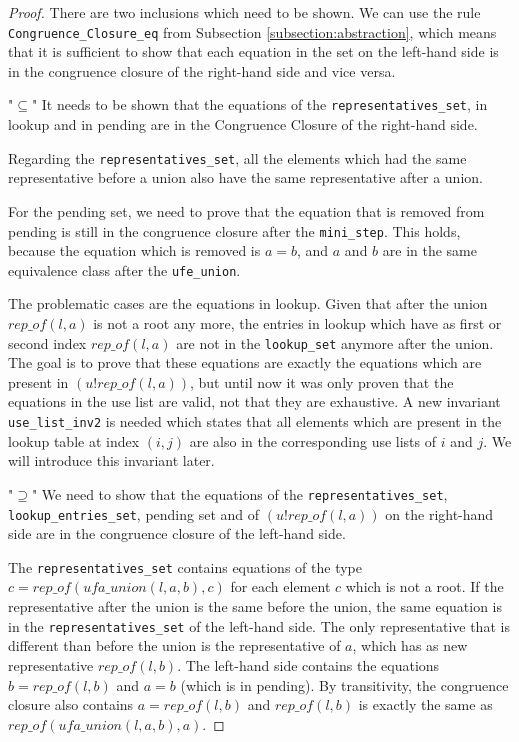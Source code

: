 \begin{proof}
There are two inclusions which need to be shown. We can use the rule \lstinline{Congruence_Closure_eq} from Subsection \ref{subsection:abstraction}, which means that it is sufficient to show that each equation in the set on the left-hand side is in the congruence closure of the right-hand side and vice versa.

"$\subseteq$" It needs to be shown that the equations of the \lstinline{representatives_set}, in lookup and in pending are in the Congruence Closure of the right-hand side.

Regarding the \lstinline{representatives_set}, all the elements which had the same representative before a union also have the same representative after a union.

For the pending set, we need to prove that the equation that is removed from pending is still in the congruence closure after the \lstinline{mini_step}. This holds, because the equation which is removed is $a = b$, and $a$ and $b$ are in the same equivalence class after the \lstinline{ufe_union}.

The problematic cases are the equations in lookup. Given that after the union $rep\_of(l, a)$ is not a root any more, the entries in lookup which have as first or second index $rep\_of(l, a)$ are not in the \lstinline{lookup_set} anymore after the union. The goal is to prove that these equations are exactly the equations which are present in $(u ! rep\_of(l, a))$, but until now it was only proven that the equations in the use list are valid, not that they are exhaustive. A new invariant \lstinline{use_list_inv2} is needed which states that all elements which are present in the lookup table at index $(i, j)$ are also in the corresponding use lists of $i$ and $j$. We will introduce this invariant later.

"$\supseteq$" We need to show that the equations of the \lstinline{representatives_set}, \lstinline{lookup_entries_set}, pending set and of $(u ! rep\_of(l, a))$ on the right-hand side are in the congruence closure of the left-hand side.

The \lstinline{representatives_set} contains equations of the type $c = rep\_of (ufa\_union(l, a, b), c)$ for each element $c$ which is not a root. If the representative after the union is the same before the union, the same equation is in the \lstinline{representatives_set} of the left-hand side. The only representative that is different than before the union is the representative of $a$, which has as new representative $rep\_of(l, b)$. The left-hand side contains the equations $b = rep\_of(l, b)$ and $a = b$ (which is in pending). By transitivity, the congruence closure also contains $a = rep\_of(l, b)$ and $rep\_of(l, b)$ is exactly the same as $rep\_of (ufa\_union(l, a, b), a)$.


\end{proof}
